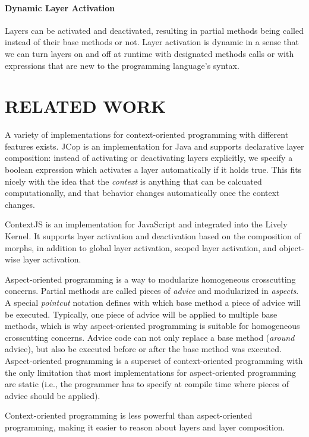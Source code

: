 \documentclass{sig-alternate}
\begin{document}
\paragraph{Dynamic Layer Activation}
Layers can be activated and deactivated, resulting in partial methods being called instead of their base methods or not. Layer activation is dynamic in a sense that we can turn layers on and off at runtime with designated methods calls or with expressions that are new to the programming language's syntax.

\section{RELATED WORK}
A variety of implementations for context-oriented programming with different features exists. JCop is an implementation for Java and supports declarative layer composition: instead of activating or deactivating layers explicitly, we specify a boolean expression which activates a layer automatically if it holds true. This fits nicely with the idea that the \emph{context} is anything that can be calcuated computationally, and that behavior changes automatically once the context changes.

ContextJS is an implementation for JavaScript and integrated into the Lively Kernel. It supports layer activation and deactivation based on the composition of morphs, in addition to global layer activation, scoped layer activation, and object-wise layer activation.

Aspect-oriented programming is a way to modularize homogeneous crosscutting concerns. Partial methods are called pieces of \emph{advice} and modularized in \emph{aspects}. A special \emph{pointcut} notation defines with which base method a piece of advice will be executed. Typically, one piece of advice will be applied to multiple base methods, which is why aspect-oriented programming is suitable for homogeneous crosscutting concerns. Advice code can not only replace a base method (\emph{around} advice), but also be executed before or after the base method was executed. Aspect-oriented programming is a superset of context-oriented programming with the only limitation that most implementations for aspect-oriented programming are static (i.e., the programmer has to specify at compile time where pieces of advice should be applied).

Context-oriented programming is less powerful than aspect-oriented programming, making it easier to reason about layers and layer composition.
\end{document}
